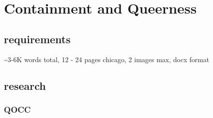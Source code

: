 \documentclass[11pt]{article}
\author{Filipa  Calado}
\date{\today}
\title{}
\begin{document}
\tableofcontents

\section{Containment and Queerness}
\label{sec:org80903e0}
\subsection{requirements}
\label{sec:org0a0ad21}
\textasciitilde{}3-6K words total, 12 - 24 pages
chicago, 2 images max, docx format
\subsection{research}
\label{sec:orgee478a5}
\subsubsection{QOCC}
\label{sec:org4a867ef}
\end{document}
